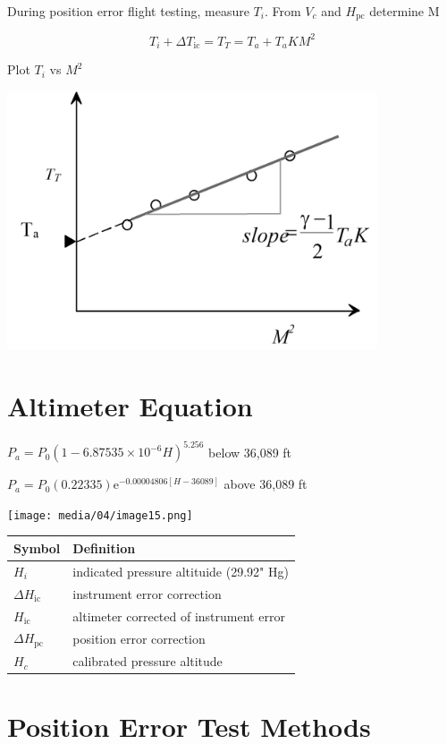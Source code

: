 \documentclass[
]{book}
\begin{document}
During position error flight testing, measure \(T_i\). From \(V_c\) and \(H_{\mathrm{pc}}\) determine M

\[ T_i + \Delta T_{\mathrm{ic}} = T_T = T_a + T_aKM^2 \]

Plot \(T_i\) vs \(M^2\)

\includegraphics[width=4.3125in,height=3in]{media/04/image14.png}

\hypertarget{altimeter-equation}{%
\section{Altimeter Equation}\label{altimeter-equation}}

\(P_a = P_0 \left(1-6.875 35 \times 10^{-6} H\right)^{5.256}\) below 36,089 ft

\(P_a = P_0 \left(0.223 35 \right) \textrm{e}^{-0.000 048 06[H-36089]}\) above 36,089 ft

\texttt{[image: media/04/image15.png]}

\begin{longtable}[]{@{}ll@{}}
\toprule
Symbol & Definition\tabularnewline
\midrule
\endhead
\(H_i\) & indicated pressure altituide (29.92" Hg)\tabularnewline
\(\Delta H_{\mathrm{ic}}\) & instrument error correction\tabularnewline
\(H_{\mathrm{ic}}\) & altimeter corrected of instrument error\tabularnewline
\(\Delta H_{\mathrm{pc}}\) & position error correction\tabularnewline
\(H_c\) & calibrated pressure altitude\tabularnewline
\bottomrule
\end{longtable}

\hypertarget{position-error-test-methods}{%
\section{Position Error Test Methods}\label{position-error-test-methods}}
\end{document}
